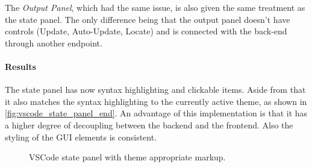 The \emph{Output Panel}, which had the same issue, is also given the same treatment as the state panel. The only difference being that the output panel doesn't have controls (Update, Auto-Update, Locate) and is connected with the back-end through another endpoint. 

\paragraph{Results}
The state panel has now syntax highlighting and clickable items. Aside from that it also matches the syntax highlighting to the currently active theme, as shown in \autoref{fig:vscode_state_panel_end}. An advantage of this implementation is that it has a higher degree of decoupling between the backend and the frontend. Also the styling of the GUI elements is consistent.


\begin{figure}[!htbp]
  \centering
  \hfill
  \caption{VSCode state panel with theme appropriate markup.}
  \label{fig:vscode_state_panel_end}
\end{figure}